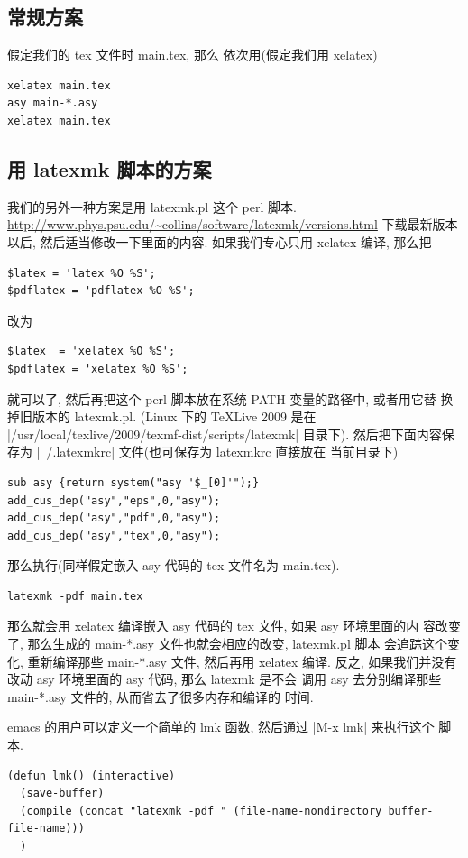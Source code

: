 \documentclass[nofonts,CJKnormalspaces]{ctexbook}[2009/05/20]
\begin{document}
\subsection{常规方案}
假定我们的 tex 文件时 main.tex, 那么
依次用(假定我们用 xelatex)
\begin{verbatim}
xelatex main.tex
asy main-*.asy
xelatex main.tex
\end{verbatim}

\subsection{用 latexmk 脚本的方案}
我们的另外一种方案是用
latexmk.pl 这个 perl 脚本.
\url{http://www.phys.psu.edu/~collins/software/latexmk/versions.html}
下载最新版本以后,
然后适当修改一下里面的内容. 如果我们专心只用 xelatex 编译, 那么把
\begin{verbatim}
$latex = 'latex %O %S';
$pdflatex = 'pdflatex %O %S';
\end{verbatim}
改为
\begin{verbatim}
$latex  = 'xelatex %O %S';
$pdflatex = 'xelatex %O %S';
\end{verbatim}
就可以了, 然后再把这个 perl 脚本放在系统 PATH 变量的路径中, 或者用它替
换掉旧版本的 latexmk.pl. (Linux 下的 TeXLive 2009 是在
|/usr/local/texlive/2009/texmf-dist/scripts/latexmk| 目录下).
然后把下面内容保存为 |~/.latexmkrc| 文件(也可保存为 latexmkrc 直接放在
当前目录下)
\begin{verbatim}
sub asy {return system("asy '$_[0]'");}
add_cus_dep("asy","eps",0,"asy");
add_cus_dep("asy","pdf",0,"asy");
add_cus_dep("asy","tex",0,"asy");
\end{verbatim}
那么执行(同样假定嵌入 asy 代码的 tex 文件名为 main.tex).
\begin{verbatim}
latexmk -pdf main.tex
\end{verbatim}
那么就会用 xelatex 编译嵌入 asy 代码的 tex 文件, 如果 asy 环境里面的内
容改变了, 那么生成的 main-*.asy 文件也就会相应的改变, latexmk.pl 脚本
会追踪这个变化, 重新编译那些 main-*.asy 文件, 然后再用 xelatex 编译.
反之, 如果我们并没有改动 asy 环境里面的 asy 代码, 那么 latexmk 是不会
调用 asy 去分别编译那些 main-*.asy 文件的, 从而省去了很多内存和编译的
时间.

emacs 的用户可以定义一个简单的 lmk 函数, 然后通过 |M-x lmk| 来执行这个
脚本.
\begin{verbatim}
(defun lmk() (interactive)
  (save-buffer)
  (compile (concat "latexmk -pdf " (file-name-nondirectory buffer-file-name)))
  )
\end{verbatim}
\end{document}
